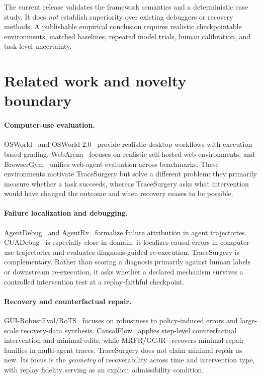 \documentclass{article}
\begin{document}
The current release validates the framework semantics and a deterministic case study. It does \emph{not} establish superiority over existing debuggers or recovery methods. A publishable empirical conclusion requires realistic checkpointable environments, matched baselines, repeated model trials, human calibration, and task-level uncertainty.

\section{Related work and novelty boundary}

\paragraph{Computer-use evaluation.}
OSWorld~\citep{xie2024osworld} and OSWorld 2.0~\citep{yuan2026osworld2} provide realistic desktop workflows with execution-based grading. WebArena~\citep{zhou2023webarena} focuses on realistic self-hosted web environments, and BrowserGym~\citep{dechezelles2025browsergym} unifies web-agent evaluation across benchmarks. These environments motivate TraceSurgery but solve a different problem: they primarily measure whether a task succeeds, whereas TraceSurgery asks what intervention would have changed the outcome and when recovery ceases to be possible.

\paragraph{Failure localization and debugging.}
AgentDebug~\citep{zhu2025agentdebug} and AgentRx~\citep{barke2026agentrx} formalize failure attribution in agent trajectories. CUADebug~\citep{zhang2026cuadebug} is especially close in domain: it localizes causal errors in computer-use trajectories and evaluates diagnosis-guided re-execution. TraceSurgery is complementary. Rather than scoring a diagnosis primarily against human labels or downstream re-execution, it asks whether a declared mechanism survives a controlled intervention test at a replay-faithful checkpoint.

\paragraph{Recovery and counterfactual repair.}
GUI-RobustEval/RoTS~\citep{bu2026rots} focuses on robustness to policy-induced errors and large-scale recovery-data synthesis. CausalFlow~\citep{bonagiri2026causalflow} applies step-level counterfactual intervention and minimal edits, while MRFR/GCJR~\citep{li2026mrfr} recovers minimal repair families in multi-agent traces. TraceSurgery does not claim minimal repair as new. Its focus is the \emph{geometry} of recoverability across time and intervention type, with replay fidelity serving as an explicit admissibility condition.
\end{document}
